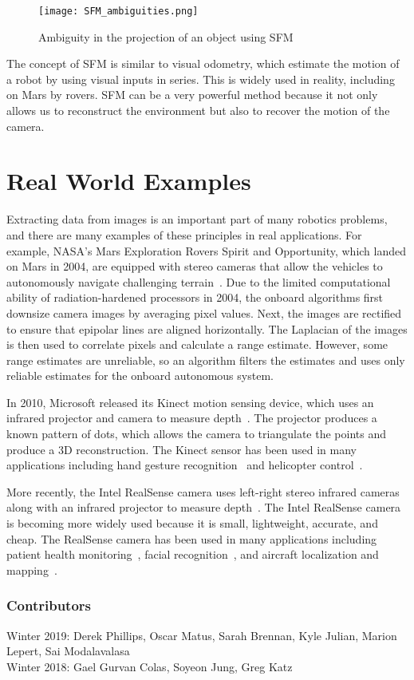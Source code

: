 \documentclass[twoside]{article}
\begin{document}
\begin{figure}[h!]
  \begin{center}
	\texttt{[image: SFM\_ambiguities.png]}
  \end{center}
  \caption{Ambiguity in the projection of an object using SFM}
  \label{amb}
\end{figure}

The concept of SFM is similar to visual odometry, which estimate the motion of a robot by using visual inputs in series. This is widely used in reality, including on Mars by rovers. SFM can be a very powerful method because it not only allows us to reconstruct the environment but also to recover the motion of the camera.

\section{Real World Examples}
Extracting data from images is an important part of many robotics problems, and there are many examples of these principles in real applications. For example, NASA's Mars Exploration Rovers Spirit and Opportunity, which landed on Mars in 2004, are equipped with stereo cameras that allow the vehicles to autonomously navigate challenging terrain~\cite{goldberg2002stereo}. Due to the limited computational ability of radiation-hardened processors in 2004, the onboard algorithms first downsize camera images by averaging pixel values. Next, the images are rectified to ensure that epipolar lines are aligned horizontally. The Laplacian of the images is then used to correlate pixels and calculate a range estimate. However, some range estimates are unreliable, so an algorithm filters the estimates and uses only reliable estimates for the onboard autonomous system. 

In 2010, Microsoft released its Kinect motion sensing device, which uses an infrared projector and camera to measure depth~\cite{zhang2012microsoft}. The projector produces a known pattern of dots, which allows the camera to triangulate the points and produce a 3D reconstruction. The Kinect sensor has been used in many applications including hand gesture recognition~\cite{ren2011robust} and helicopter control~\cite{stowers2011altitude}.

More recently, the Intel RealSense camera uses left-right stereo infrared cameras along with an infrared projector to measure depth~\cite{keselman2017intel}. The Intel RealSense camera is becoming more widely used because it is small, lightweight, accurate, and cheap. The RealSense camera has been used in many applications including patient health monitoring~\cite{siena2018utilising}, facial recognition~\cite{patil2016real}, and aircraft localization and mapping~\cite{bi2016mav}. 


\newpage




\subsubsection*{Contributors}
Winter 2019: Derek Phillips, Oscar Matus, Sarah Brennan, Kyle Julian, Marion Lepert, Sai Modalavalasa
\\
Winter 2018: Gael Gurvan Colas, Soyeon Jung, Greg Katz
\end{document}
